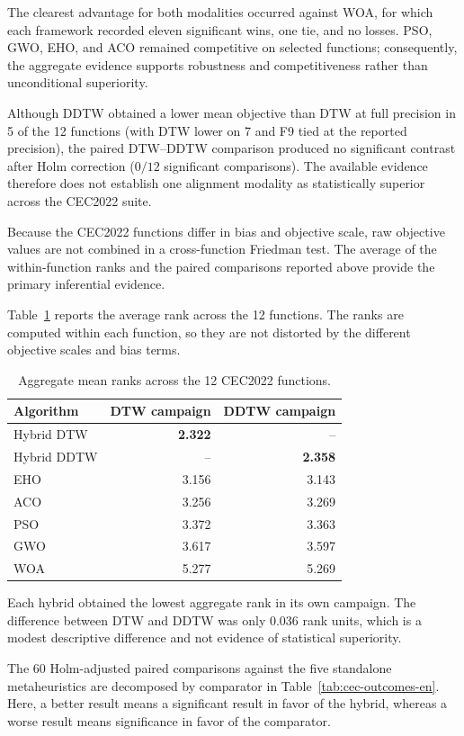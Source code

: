 The clearest advantage for both modalities occurred against WOA, for which each
framework recorded eleven significant wins, one tie, and no losses. PSO, GWO, EHO,
and ACO remained competitive on selected functions; consequently, the
aggregate evidence supports robustness and competitiveness rather than
unconditional superiority.

Although DDTW obtained a lower mean objective than DTW at full precision in 5
of the 12 functions (with DTW lower on 7 and F9 tied at the reported precision), the paired DTW--DDTW comparison produced no significant contrast
after Holm correction ($0/12$ significant comparisons). The available evidence
therefore does not establish one alignment modality as statistically superior
across the CEC2022 suite.

Because the CEC2022 functions differ in bias and objective scale, raw objective
values are not combined in a cross-function Friedman test. The average of the
within-function ranks and the paired comparisons reported above provide the
primary inferential evidence.

Table~\ref{tab:cec-aggregate-ranks-en} reports the average rank across the 12
functions. The ranks are computed within each function, so they are not
distorted by the different objective scales and bias terms.

\begin{table}[p]
\centering
\caption{Aggregate mean ranks across the 12 CEC2022 functions.}
\label{tab:cec-aggregate-ranks-en}
\begin{tabular}{lrr}
\toprule
Algorithm & DTW campaign & DDTW campaign \\
\midrule
Hybrid DTW & \textbf{2.322} & -- \\
Hybrid DDTW & -- & \textbf{2.358} \\
EHO & 3.156 & 3.143 \\
ACO & 3.256 & 3.269 \\
PSO & 3.372 & 3.363 \\
GWO & 3.617 & 3.597 \\
WOA & 5.277 & 5.269 \\
\bottomrule
\end{tabular}
\end{table}

Each hybrid obtained the lowest aggregate rank in its own campaign. The
difference between DTW and DDTW was only 0.036 rank units, which is a modest
descriptive difference and not evidence of statistical superiority.

The 60 Holm-adjusted paired comparisons against the five standalone
metaheuristics are decomposed by comparator in Table~\ref{tab:cec-outcomes-en}.
Here, a better result means a significant result in favor of the hybrid,
whereas a worse result means significance in favor of the comparator.

